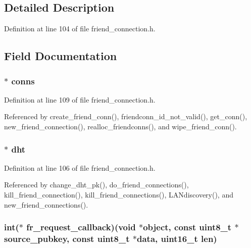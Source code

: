 \subsection{Detailed Description}


Definition at line 104 of file friend\+\_\+connection.\+h.



\subsection{Field Documentation}
\hypertarget{struct_friend___connections_a2690adb6c61682af2e8592f53e9de9a0}{
\subsubsection[{conns}]{$\ast$ conns}}\label{struct_friend___connections_a2690adb6c61682af2e8592f53e9de9a0}


Definition at line 109 of file friend\+\_\+connection.\+h.



Referenced by create\+\_\+friend\+\_\+conn(), friendconn\+\_\+id\+\_\+not\+\_\+valid(), get\+\_\+conn(), new\+\_\+friend\+\_\+connection(), realloc\+\_\+friendconns(), and wipe\+\_\+friend\+\_\+conn().

\hypertarget{struct_friend___connections_a8b3d6ce8745acc52695e252bdb1531b6}{
\subsubsection[{dht}]{$\ast$ dht}}\label{struct_friend___connections_a8b3d6ce8745acc52695e252bdb1531b6}


Definition at line 106 of file friend\+\_\+connection.\+h.



Referenced by change\+\_\+dht\+\_\+pk(), do\+\_\+friend\+\_\+connections(), kill\+\_\+friend\+\_\+connection(), kill\+\_\+friend\+\_\+connections(), L\+A\+Ndiscovery(), and new\+\_\+friend\+\_\+connections().

\hypertarget{struct_friend___connections_a36e4f0e3167d9e95df5d7f83cbafa7fc}{
\subsubsection[{fr\+\_\+request\+\_\+callback}]{\setlength{\rightskip}{0pt plus 5cm}int($\ast$ fr\+\_\+request\+\_\+callback)(void $\ast$object, const uint8\+\_\+t $\ast$source\+\_\+pubkey, const uint8\+\_\+t $\ast$data, uint16\+\_\+t len)}}\label{struct_friend___connections_a36e4f0e3167d9e95df5d7f83cbafa7fc}


